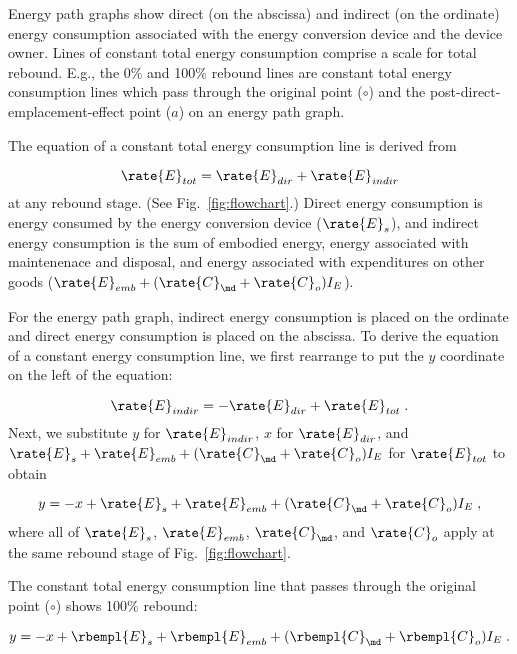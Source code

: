 Energy path graphs show direct (on the abscissa) and indirect (on the ordinate)
energy consumption associated with the energy conversion device 
and the device owner.
Lines of constant total energy consumption comprise a 
scale for total rebound.
E.g., the 0\% and 100\% rebound lines are constant total energy consumption
lines which pass through the original point ($\circ$) and
the post-direct-emplacement-effect point ($a$) 
on an energy path graph.

The equation of a constant total energy consumption line is derived from 

\begin{equation}
  \rate{E}_{tot} = \rate{E}_{dir} + \rate{E}_{indir}
\end{equation}
%
at any rebound stage. (See Fig.~\ref{fig:flowchart}.)
Direct energy consumption is energy consumed by the energy conversion device
($\rate{E}_s$), and 
indirect energy consumption is the sum of embodied energy, 
energy associated with maintenenace and disposal, and energy associated 
with expenditures on other goods
($\rate{E}_{emb} + (\rate{C}_{\md} + \rate{C}_o) I_E$).

For the energy path graph, 
indirect energy consumption is placed on the ordinate
and direct energy consumption is placed on the abscissa.
To derive the equation of a constant energy consumption line, 
we first rearrange to put the $y$ coordinate on the left of the equation:

\begin{equation}
  \rate{E}_{indir} = - \rate{E}_{dir} + \rate{E}_{tot} \; .
\end{equation}
%
Next, we substitute $y$ for $\rate{E}_{indir}$,
$x$ for $\rate{E}_{dir}$, and 
$\rate{E}_s + \rate{E}_{emb} + (\rate{C}_{\md} + \rate{C}_o) I_E$ for $\rate{E}_{tot}$
to obtain

\begin{equation}
  y = -x + \rate{E}_s + \rate{E}_{emb} + (\rate{C}_{\md} + \rate{C}_o) I_E \; ,
\end{equation}
%
where all of $\rate{E}_s$, $\rate{E}_{emb}$, $\rate{C}_{\md}$, and $\rate{C}_o$
apply at the same rebound stage of Fig.~\ref{fig:flowchart}.

The constant total energy consumption line 
that passes through the original point ($\circ$)
shows 100\% rebound:

\begin{equation}
  y = -x + \rbempl{E}_s + \rbempl{E}_{emb} + (\rbempl{C}_{\md} + \rbempl{C}_o) I_E \; .
\end{equation}

